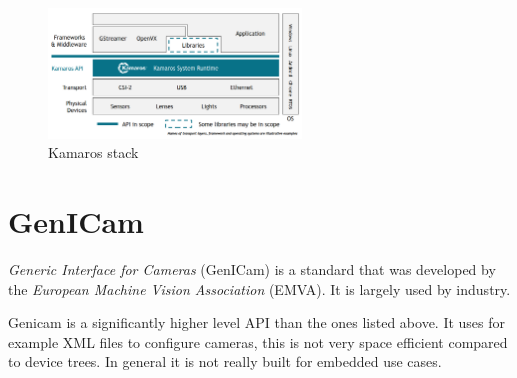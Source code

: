 \begin{figure}
    \begin{center}
        \includegraphics[width=0.60\textwidth]{figures/kamaros_stack.png}
    \end{center}
    \caption[Kamaros stack]{Kamaros stack\footnotemark}\label{fig:kamaros_stack}
\end{figure}

\section {GenICam}
\textit{Generic Interface for Cameras} (GenICam) is a standard that was
developed by the \textit{European Machine Vision Association} (EMVA). It is
largely used by industry.

Genicam is a significantly higher level API than the ones listed above. It
uses for example XML files to configure cameras, this is not very space
efficient compared to device trees. In general it is not really built for
embedded use cases.


